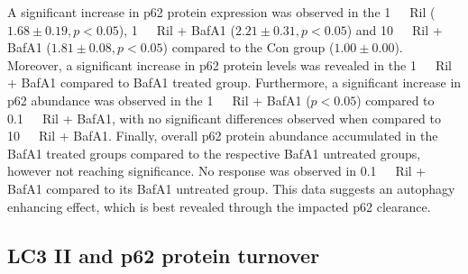 A significant increase in p62 protein expression was observed in the \SI{1}{\mu\Molar}\ Ril ($1.68 \pm 0.19, p < 0.05$), \SI{1}{\mu\Molar}\ Ril + BafA1 ($2.21 \pm 0.31, p < 0.05$) and \SI{10}{\mu\Molar}\ Ril + BafA1 ($1.81 \pm 0.08, p < 0.05$) compared to the Con group ($1.00 \pm 0.00$). Moreover, a significant increase in p62 protein levels was revealed in the \SI{1}{\mu\Molar}\ Ril + BafA1 compared to BafA1 treated group. Furthermore, a significant increase in p62 abundance was observed in the \SI{1}{\mu\Molar}\ Ril + BafA1 ($p < 0.05$) compared to \SI{0.1}{\mu\Molar}\ Ril + BafA1, with no significant differences observed when compared to \SI{10}{\mu\Molar}\ Ril + BafA1. Finally, overall p62 protein abundance accumulated in the BafA1 treated groups compared to the respective BafA1 untreated groups, however not reaching significance. No response was observed in \SI{0.1}{\mu\Molar}\ Ril + BafA1 compared to its BafA1 untreated group. This data suggests an autophagy enhancing effect, which is best revealed through the impacted p62 clearance.

\subsection{LC3 II and p62 protein turnover}










